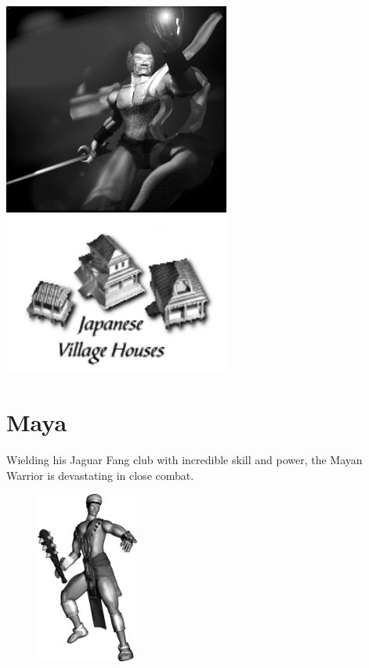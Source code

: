 \begin{center}
	\includegraphics[width=74.25mm]{Amindturner}\includegraphics[width=74.25mm]{Ijapanesehouse}
\end{center}

\clearpage

\section{Maya}

Wielding his Jaguar Fang club with incredible skill and power, the Mayan Warrior is devastating in close combat.

\begin{figure}
	\begin{center}
		\vspace{-20pt}
		\includegraphics[width=0.3\textwidth]{Amaya}
	\end{center}
	\vspace{-20pt}
\end{figure}


